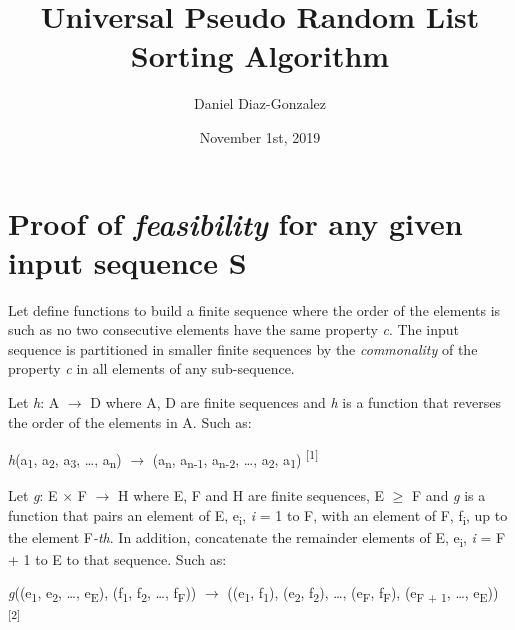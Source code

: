\documentclass[12pt]{article}
\title{Universal Pseudo Random List Sorting Algorithm}
\author[1,2]{Daniel Diaz-Gonzalez}
\affil[1]{UCL DCAL Research Centre - IT Officer}
\affil[2]{University of London, Goldsmiths, University of London - Undergraduate BSc Computer Science}
\date{November 1st, 2019}
\begin{document}
  \maketitle

\section*{Proof of \textit{feasibility} for any given input sequence \textbf{S}}

Let define functions to build a finite sequence where the order of the elements is such as 
no two consecutive elements have the same property \textit{c}\textsuperscript{\textdagger}. The input sequence is partitioned in smaller finite sequences by the \textit{commonality} of the property \textit{c} in all elements of any sub-sequence.

Let \textit{h}: A $\rightarrow$ D where A, D are finite sequences and \textit{h} is a function 
that reverses the order of the elements in A. Such as:

\begin{center}
\textit{h}(a\textsubscript{1}, a\textsubscript{2}, a\textsubscript{3}, \ldots, a\textsubscript{n}) 
$\rightarrow$ (a\textsubscript{n}, a\textsubscript{n-1}, a\textsubscript{n-2}, \ldots, a\textsubscript{2}, a\textsubscript{1}) \textsuperscript{[1]}
\end{center}

Let \textit{g}: E \ensuremath{\times} F $\rightarrow$ H where E, F and H are finite sequences, 
\textbar{}E\textbar{} $\geq$ \textbar{}F\textbar{} and \textit{g} is a function that 
pairs an element of E, e\textsubscript{i}, \textit{i} = 1 to \textbar{}F\textbar{}, 
with an element of F, f\textsubscript{i}, up to the element \textbar{}F\textbar{}\textit{-th}. 
In addition, concatenate the remainder elements of E, e\textsubscript{i}, \textit{i} = \textbar{}F\textbar{} + 1 to \textbar{}E\textbar{} to that sequence. Such as:

\begin{center}
\textit{g}((e\textsubscript{1}, e\textsubscript{2}, \ldots, e\textsubscript{\textbar{}E\textbar{}}), 
(f\textsubscript{1}, f\textsubscript{2}, \ldots, f\textsubscript{\textbar{}F\textbar{}})) 
$\rightarrow$ ((e\textsubscript{1}, f\textsubscript{1}), (e\textsubscript{2}, f\textsubscript{2}), 
\ldots, (e\textsubscript{\textbar{}F\textbar{}}, f\textsubscript{\textbar{}F\textbar{}}), 
(e\textsubscript{\textbar{}F\textbar{} + 1}, \ldots, e\textsubscript{\textbar{}E\textbar{}})) 
\textsuperscript{[2]}
\end{center}
\end{document}
